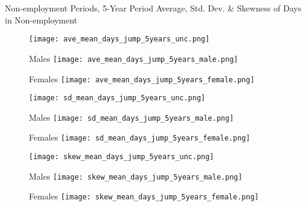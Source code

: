 \documentclass[hyperref={bookmarks=false}]{beamer}
\begin{document}
\begin{appendix}
\begin{frame}{Non-employment Periods, 5-Year Period}
Average, Std. Dev. \& Skewness of Days in Non-employment
\begin{figure}[!t]
\centering
\begin{minipage}[b]{0.30\textwidth}{}
\centering
\texttt{[image: ave\_mean\_days\_jump\_5years\_unc.png]}
\end{minipage}
\begin{minipage}[b]{0.30\textwidth}{Males}
\centering
\texttt{[image: ave\_mean\_days\_jump\_5years\_male.png]}
\end{minipage}
\begin{minipage}[b]{0.30\textwidth}{Females}
\centering
\texttt{[image: ave\_mean\_days\_jump\_5years\_female.png]}
\end{minipage}
\begin{minipage}[b]{0.30\textwidth}{}
\centering
\texttt{[image: sd\_mean\_days\_jump\_5years\_unc.png]}
\end{minipage}
\begin{minipage}[b]{0.30\textwidth}{Males}
\centering
\texttt{[image: sd\_mean\_days\_jump\_5years\_male.png]}
\end{minipage}
\begin{minipage}[b]{0.30\textwidth}{Females}
\centering
\texttt{[image: sd\_mean\_days\_jump\_5years\_female.png]}
\end{minipage}
\begin{minipage}[b]{0.30\textwidth}{}
\centering
\texttt{[image: skew\_mean\_days\_jump\_5years\_unc.png]}
\end{minipage}
\begin{minipage}[b]{0.30\textwidth}{Males}
\centering
\texttt{[image: skew\_mean\_days\_jump\_5years\_male.png]}
\end{minipage}
\begin{minipage}[b]{0.30\textwidth}{Females}
\centering
\texttt{[image: skew\_mean\_days\_jump\_5years\_female.png]}
\end{minipage}
\end{figure}
\end{frame}


\end{appendix}
\end{document}
